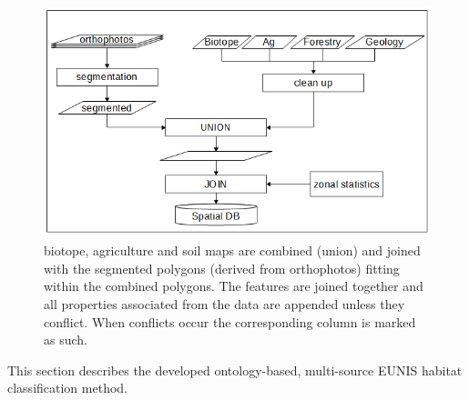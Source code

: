 \documentclass[authoryear,preprint,12pt,number]{elsarticle}
\begin{document}
\begin{figure} \includegraphics[width=1\textwidth]{diagrams/pre_processing.png}
    \caption{biotope, agriculture and soil maps are combined 
    (union) and joined with the segmented polygons (derived from orthophotos) 
    fitting within the combined polygons. The features are joined together 
    and all properties associated from the data are appended unless they 
    conflict. 
    When conflicts occur the corresponding column is marked as such.}
\label{fig:pre-processing}
\end{figure}

This section describes the developed ontology-based, multi-source EUNIS 
habitat classification method.
\label{subsec:method_overview}
\end{document}
